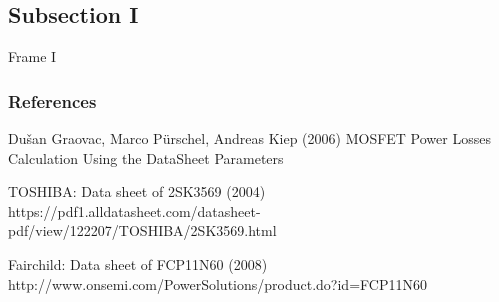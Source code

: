 \documentclass{beamer}
\begin{document}
\subsection{Subsection I}
\begin{frame}{Frame I}
    
\end{frame}
\begin{frame}
\frametitle{References}
\footnotesize{
\begin{thebibliography}{99} %
 Dušan Graovac, Marco Pürschel, Andreas Kiep (2006)
\newblock MOSFET Power Losses Calculation Using the DataSheet Parameters
\end{thebibliography}
\begin{thebibliography}{99}
 TOSHIBA: Data sheet of 2SK3569 (2004)
\newblock https://pdf1.alldatasheet.com/datasheet-pdf/view/122207/TOSHIBA/2SK3569.html
\end{thebibliography}
\begin{thebibliography}{99}
 Fairchild: Data sheet of FCP11N60 (2008)
\newblock http://www.onsemi.com/PowerSolutions/product.do?id=FCP11N60
\end{thebibliography}
}
\end{frame}
\end{document}
